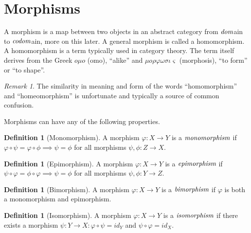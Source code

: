 \documentclass[10pt, oneside, reqno]{amsart}
\theoremstyle{plain}%
\theoremstyle{definition}
\newtheorem{defn}[thm]{Definition}
\theoremstyle{remark}
\newtheorem*{rem}{Remark}
\newcommand{\Id}{\mathit{id}_}
\begin{document}
\section{Morphisms} %
\label{sec:morphisms}
A morphism is a map between two objects in an abstract category from $\emph{dom}$ain to $\emph{codom}$ain, more on this later.
A general morphism is called a homomorphism. A homomorphism is a term typically used in category theory.
The term itself derives from the Greek $o \mu o$ (omo), ``alike'' and $\mu o \rho\varphi\omega\sigma\iota\varsigma$
(morphosis), ``to form'' or ``to shape''.
\begin{rem}
 The similarity in meaning and form of the words ``homomorphism'' and ``homeomorphism'' is unfortunate and typically
 a source of common confusion.
\end{rem}

Morphisms can have any of the following properties.

\begin{defn}[Monomorphism]
 A morphism $\varphi: X \to Y$ is a $\emph{monomorphism}$ if $\varphi \circ \psi = \varphi \circ \phi \implies \psi = \phi$ for all morphisms $\psi,\phi: Z \to X$.
 \end{defn}

\begin{defn}[Epimorphism]
 A morphism $\varphi: X \to Y$ is a $\emph{epimorphism}$ if $\psi \circ \varphi = \phi \circ \varphi \implies \psi = \phi$ for all morphisms $\psi,\phi: Y \to Z$.
\end{defn}
 
\begin{defn}[Bimorphism]
 A morphism $\varphi: X \to Y$ is a $\emph{bimorphism}$ if $\varphi$ is both a monomorphism and epimorphism.
\end{defn}

\begin{defn}[Isomorphism]
 A morphism $\varphi: X \to Y$ is a $\emph{isomorphism}$ if there exists a morphism $\psi: Y \to X : \varphi \circ \psi = \Id{Y}$ and $\psi \circ \varphi = \Id{X}$.
\end{defn}
\end{document}
